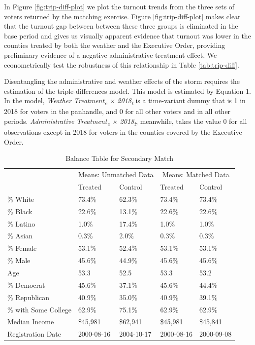 \documentclass[
  12pt,
]{article}
\begin{document}
In Figure \ref{fig:trip-diff-plot} we plot the turnout trends from the three sets of voters returned by the matching exercise. Figure \ref{fig:trip-diff-plot} makes clear that the turnout gap between between these three groups is eliminated in the base period and gives us visually apparent evidence that turnout was lower in the counties treated by both the weather and the Executive Order, providing preliminary evidence of a negative administrative treatment effect. We econometrically test the robustness of this relationship in Table \ref{tab:trip-diff}.

Disentangling the administrative and weather effects of the storm requires the estimation of the triple-differences model. This model is estimated by Equation 1. In the model, \emph{Weather Treatment\textsubscript{c} × 2018\textsubscript{t}} is a time-variant dummy that is 1 in 2018 for voters in the panhandle, and 0 for all other voters and in all other periods. \emph{Administrative Treatment\textsubscript{c} × 2018\textsubscript{t}}, meanwhile, takes the value 0 for all observations except in 2018 for voters in the counties covered by the Executive Order.

\begin{singlespace}
\begin{table}[!h]

\caption{\label{tab:balance-tab-ll2}\label{tab:balance-secondary} Balance Table for Secondary Match}
\centering
\begin{tabular}[t]{lllll}
\toprule
\multicolumn{1}{c}{ } & \multicolumn{2}{c}{Means: Unmatched Data} & \multicolumn{2}{c}{Means: Matched Data} \\
\cmidrule(l{3pt}r{3pt}){2-3} \cmidrule(l{3pt}r{3pt}){4-5}
 & Treated & Control & Treated & Control\\
\midrule
\% White & 73.4\% & 62.3\% & 73.4\% & 73.4\%\\
\% Black & 22.6\% & 13.1\% & 22.6\% & 22.6\%\\
\% Latino & 1.0\% & 17.4\% & 1.0\% & 1.0\%\\
\% Asian & 0.3\% & 2.0\% & 0.3\% & 0.3\%\\
\% Female & 53.1\% & 52.4\% & 53.1\% & 53.1\%\\
\% Male & 45.6\% & 44.9\% & 45.6\% & 45.6\%\\
Age & 53.3 & 52.5 & 53.3 & 53.2\\
\% Democrat & 45.6\% & 37.1\% & 45.6\% & 44.4\%\\
\% Republican & 40.9\% & 35.0\% & 40.9\% & 39.1\%\\
\% with Some College & 62.9\% & 75.1\% & 62.9\% & 62.9\%\\
Median Income & \$45,981 & \$62,941 & \$45,981 & \$45,841\\
Registration Date & 2000-08-16 & 2004-10-17 & 2000-08-16 & 2000-09-08\\
\bottomrule
\end{tabular}
\end{table}
\end{singlespace}
\end{document}
